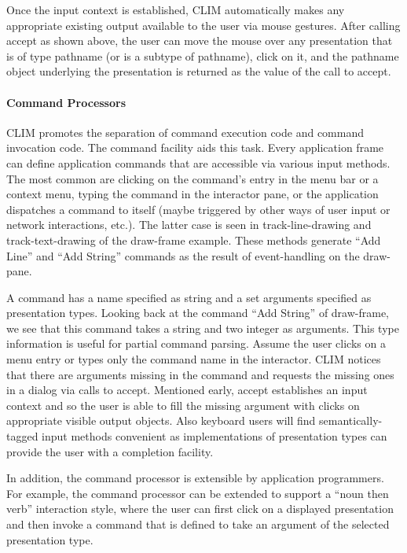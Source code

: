 \documentclass[twocolumn,a4paper]{article}
\newcommand {\code}[1]{{\sffamily #1}}
\newcommand {\CLIM}{{\small CLIM}}
\let\class\code
\let\method\code
\begin{document}
Once the input context is established, \CLIM{} automatically makes any appropriate existing output available to the user via mouse gestures. After calling \method{accept} as shown above, the user can move the mouse over any presentation that is of type pathname (or is a subtype of pathname), click on it, and the pathname object underlying the presentation is returned as the value of the call to \code{accept}.

\paragraph*{Command Processors}
\CLIM{} promotes the separation of command execution code and command invocation code. The command facility aids this task. Every application frame can define application commands that are accessible via various input methods. The most common are clicking on the command's entry in the menu bar or a context menu, typing the command in the interactor pane, or the application dispatches a command to itself (maybe triggered by other ways of user input or network interactions, etc.). The latter case is seen in \code{track-line-drawing} and \code{track-text-drawing} of the \class{draw-frame} example. These methods generate ``Add Line'' and ``Add String'' commands as the result of event-handling on the draw-pane.

A command has a name specified as string and a set arguments specified as presentation types.  Looking back at the command ``Add String'' of draw-frame, we see that this command takes a string and two integer as arguments.  This type information is useful for partial command parsing. Assume the user clicks on a menu entry or types only the command name in the interactor. \CLIM{} notices that there are arguments missing in the command and requests the missing ones in a dialog via calls to \code{accept}. Mentioned early, \code{accept} establishes an input context and so the user is able to fill the missing argument with clicks on appropriate visible output objects. Also keyboard users will find semantically-tagged input methods convenient as implementations of presentation types can provide the user with a completion facility.

In addition, the command processor is extensible by application programmers. For example, the command processor can be extended to support a ``noun then verb'' interaction style, where the user can first click on a displayed presentation and then invoke a command that is defined to take an argument of the selected presentation type.
\end{document}
